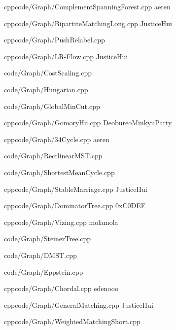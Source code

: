 \documentclass[landscape, 8pt, a4paper, oneside]{extarticle}
\begin{document}
\begin{multicols*}{3}
{}{}
{cpp}{code/Graph/ComplementSpanningForest.cpp}
{aeren}

{}{}
{cpp}{code/Graph/BipartiteMatchingLong.cpp}
{JusticeHui}

{}{}
{cpp}{code/Graph/PushRelabel.cpp}
{}

{}{}
{cpp}{code/Graph/LR-Flow.cpp}
{JusticeHui}

{code/Graph/CostScaling.cpp}

{code/Graph/Hungarian.cpp} %

{code/Graph/GlobalMinCut.cpp}

{}{}
{cpp}{code/Graph/GomoryHu.cpp}
{DeobureoMinkyuParty}

{}{}
{cpp}{code/Graph/34Cycle.cpp}
{aeren}

{code/Graph/RectlinearMST.cpp}

{code/Graph/ShortestMeanCycle.cpp}

{}{}
{cpp}{code/Graph/StableMarriage.cpp}
{JusticeHui}

{}{}
{cpp}{code/Graph/DominatorTree.cpp}
{0xC0DEF}

{}{}
{cpp}{code/Graph/Vizing.cpp}
{molamola}

{code/Graph/SteinerTree.cpp}

{code/Graph/DMST.cpp}

{code/Graph/Eppstein.cpp}

{}{}
{cpp}{code/Graph/Chordal.cpp}
{edenooo}

{}{}
{cpp}{code/Graph/GeneralMatching.cpp}
{JusticeHui}

{}{}
{cpp}{code/Graph/WeightedMatchingShort.cpp}
{}


\end{multicols*}
\end{document}
